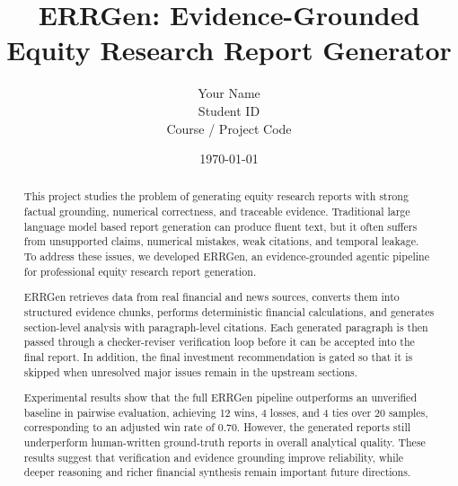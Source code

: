 \documentclass[11pt,a4paper]{article}
\title{ERRGen: Evidence-Grounded Equity Research Report Generator}
\author{Your Name \\ Student ID \\ Course / Project Code}
\date{\today}
\begin{document}
%
% 

\maketitle
\thispagestyle{empty}
\newpage

\begin{abstract}
This project studies the problem of generating equity research reports with
strong factual grounding, numerical correctness, and traceable evidence.
Traditional large language model based report generation can produce fluent
text, but it often suffers from unsupported claims, numerical mistakes, weak
citations, and temporal leakage. To address these issues, we developed
ERRGen, an evidence-grounded agentic pipeline for professional equity research
report generation.

ERRGen retrieves data from real financial and news sources, converts them into
structured evidence chunks, performs deterministic financial calculations, and
generates section-level analysis with paragraph-level citations. Each generated
paragraph is then passed through a checker-reviser verification loop before it
can be accepted into the final report. In addition, the final investment
recommendation is gated so that it is skipped when unresolved major issues
remain in the upstream sections.

Experimental results show that the full ERRGen pipeline outperforms an
unverified baseline in pairwise evaluation, achieving 12 wins, 4 losses, and
4 ties over 20 samples, corresponding to an adjusted win rate of 0.70.
However, the generated reports still underperform human-written ground-truth
reports in overall analytical quality. These results suggest that verification
and evidence grounding improve reliability, while deeper reasoning and richer
financial synthesis remain important future directions.
\end{abstract}

\newpage
\tableofcontents
\newpage
\end{document}
